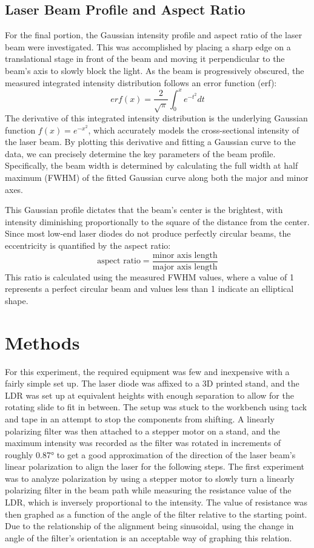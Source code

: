 \documentclass[12pt,a4paper]{article}
\begin{document}
\subsection{Laser Beam Profile and Aspect Ratio}
For the final portion, the Gaussian intensity profile and aspect ratio of the laser beam were investigated.
This was accomplished by placing a sharp edge on a translational stage in front of the beam and moving it perpendicular to the beam's axis to slowly block the light.
As the beam is progressively obscured, the measured integrated intensity distribution follows an error function (erf):
\begin{equation}
erf(x) = \frac{2}{\sqrt{\pi}}\int_0^x e^{-t^2} dt
\end{equation}
The derivative of this integrated intensity distribution is the underlying Gaussian function $f(x) = e^{-x^2}$, which accurately models the cross-sectional intensity of the laser beam.
By plotting this derivative and fitting a Gaussian curve to the data, we can precisely determine the key parameters of the beam profile.
Specifically, the beam width is determined by calculating the full width at half maximum (FWHM) of the fitted Gaussian curve along both the major and minor axes.

This Gaussian profile dictates that the beam's center is the brightest, with intensity diminishing proportionally to the square of the distance from the center.
Since most low-end laser diodes do not produce perfectly circular beams, the eccentricity is quantified by the aspect ratio:
\begin{equation}
\text{aspect ratio} = \frac{\text{minor axis length}}{\text{major axis length}}
\end{equation}
This ratio is calculated using the measured FWHM values, where a value of 1 represents a perfect circular beam and values less than 1 indicate an elliptical shape.

\section{Methods}
For this experiment, the required equipment was few and inexpensive with a fairly simple set up.
The laser diode was affixed to a 3D printed stand, and the LDR was set up at equivalent heights with enough separation to allow for the rotating slide to fit in between.
The setup was stuck to the workbench using tack and tape in an attempt to stop the components from shifting.
A linearly polarizing filter was then attached to a stepper motor on a stand, and the maximum intensity was recorded as the filter was rotated in increments of roughly 0.87° to get a good approximation of the direction of the laser beam's linear polarization to align the laser for the following steps.
The first experiment was to analyze polarization by using a stepper motor to slowly turn a linearly polarizing filter in the beam path while measuring the resistance value of the LDR, which is inversely proportional to the intensity.
The value of resistance was then graphed as a function of the angle of the filter relative to the starting point.
Due to the relationship of the alignment being sinusoidal, using the change in angle of the filter's orientation is an acceptable way of graphing this relation.
\end{document}
